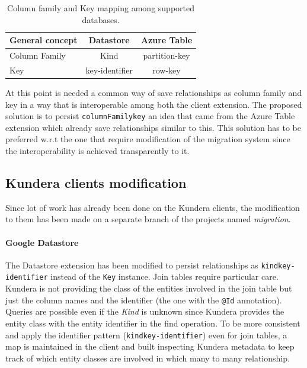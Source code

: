 \begin{table}[h]
\begin{center}
\renewcommand{\arraystretch}{1.4}
\begin{tabular}{lcc}
\hline
\textbf{General concept} & \textbf{Datastore} & \textbf{Azure Table}\\ 
\hline\hline
Column Family & Kind & partition-key \\
Key & key-identifier & row-key \\
\hline
\end{tabular}
\end{center}
\caption{Column family and Key mapping among supported databases.}
\label{table:mapping}
\end{table}

\noindent At this point is needed a common way of save relationships as column family and key in a way that is interoperable among both the client extension.
The proposed solution is to persist \texttt{columnFamily\textunderscore key} an idea that came from the Azure Table extension which already save relationships similar to this. This solution has to be preferred w.r.t the one that require modification of the migration system since the interoperability is achieved transparently to it.

\subsection{Kundera clients modification}
Since lot of work has already been done on the Kundera clients, the modification to them has been made on a separate branch of the projects named \textit{migration}.

\paragraph{Google Datastore} The Datastore extension has been modified to persist relationships as \texttt{kind\textunderscore key-identifier} instead of the \texttt{Key} instance.
Join tables require particular care. Kundera is not providing the class of the entities involved in the join table but just the column names and the identifier (the one with the \texttt{@Id} annotation). Queries are possible even if the \textit{Kind} is unknown since Kundera provides the entity class with the entity identifier in the find operation.
To be more consistent and apply the identifier pattern (\texttt{kind\textunderscore key-identifier}) even for join tables, a map is maintained in the client and built inspecting Kundera metadata to keep track of which entity classes are involved in which many to many relationship.

